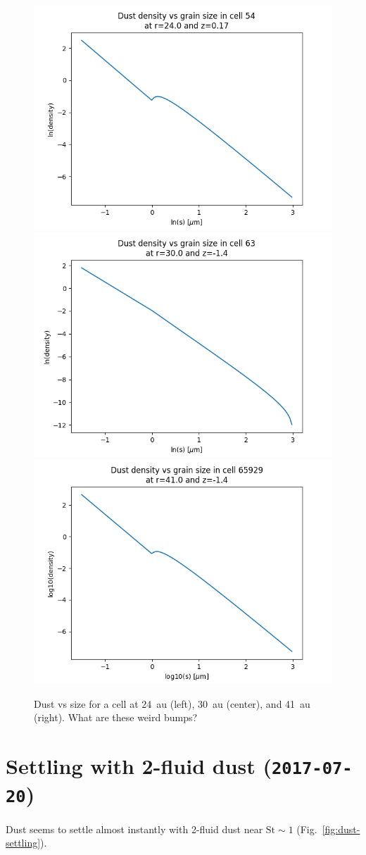 \documentclass[usenatbib,a4paper,times,fleqn]{mnras}
\newcommand{\st}{\mathrm{St}}
\begin{document}
\begin{figure}
   \begin{center}
      \includegraphics[width=0.32\columnwidth]{figs/dust-size-distribution-24.png}
      \includegraphics[width=0.32\columnwidth]{figs/dust-size-distribution-30.png}
      \includegraphics[width=0.32\columnwidth]{figs/dust-size-distribution-41.png}
      \caption{Dust vs size for a cell at 24~au (left), 30~au (center), and
         41~au (right). What are these weird bumps?}
      \label{fig:dust-in-cell}
   \end{center}
\end{figure}

\section*{Settling with 2-fluid dust (\texttt{2017-07-20})}

Dust seems to settle almost instantly with 2-fluid dust near $\st{}\sim 1$
(Fig.~\ref{fig:dust-settling}).
\end{document}
